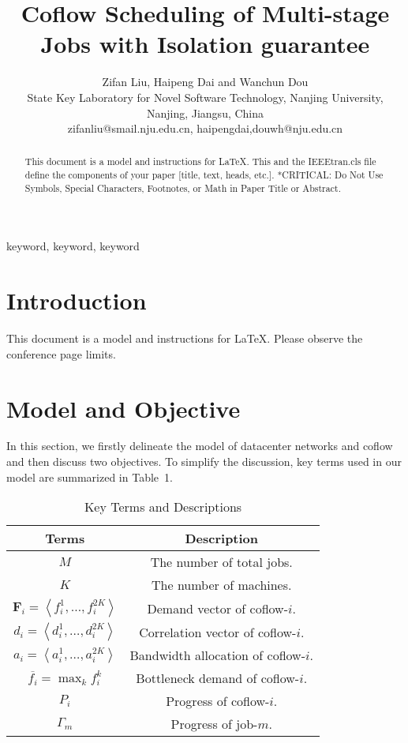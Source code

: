 \documentclass[10pt, conference, letterpaper]{IEEEtran}
\begin{document}
\title{Coflow Scheduling of Multi-stage Jobs with Isolation guarantee}

\author{Zifan Liu, Haipeng Dai and Wanchun Dou\\
State Key Laboratory for Novel Software Technology, Nanjing University, Nanjing, Jiangsu, China\\
zifanliu@smail.nju.edu.cn, haipengdai,douwh@nju.edu.cn}

\maketitle

\begin{abstract}
This document is a model and instructions for \LaTeX.
This and the IEEEtran.cls file define the components of your paper [title, text, heads, etc.]. *CRITICAL: Do Not Use Symbols, Special Characters, Footnotes,
or Math in Paper Title or Abstract.
\end{abstract}

\begin{IEEEkeywords}
keyword, keyword, keyword
\end{IEEEkeywords}

\section{Introduction}
This document is a model and instructions for \LaTeX.
Please observe the conference page limits.

\section{Model and Objective}
In this section, we firstly delineate the model of datacenter networks and coflow and then discuss two objectives. To simplify the discussion, key terms used in our model are summarized in Table~1.
\begin{table}
\caption{Key Terms and Descriptions}
\begin{center}
\begin{tabular}{|c|c|}
\hline
Terms & Description\\
\hline
$M$ & The number of total jobs.\\
\hline
$K$ & The number of machines.\\
\hline
$\mathbf{F}_i = \left\langle f_i^1,\dots,f_i^{2K}\right\rangle$ & Demand vector of coflow-$i$.\\
\hline
$d_i = \left\langle d_i^1,\dots,d_i^{2K}\right\rangle$ & Correlation vector of coflow-$i$.\\
\hline
$a_i=\left\langle a_i^1,\dots,a_i^{2K}\right\rangle$ & Bandwidth allocation of coflow-$i$.\\
\hline
$\overline{f_i}=\max_{k} f_i^k$ & Bottleneck demand of coflow-$i$.\\
\hline
$P_i$ & Progress of coflow-$i$.\\
\hline
$\Gamma_m$ & Progress of job-$m$.\\
\hline
\end{tabular}
\end{center}
\end{table}
\end{document}
